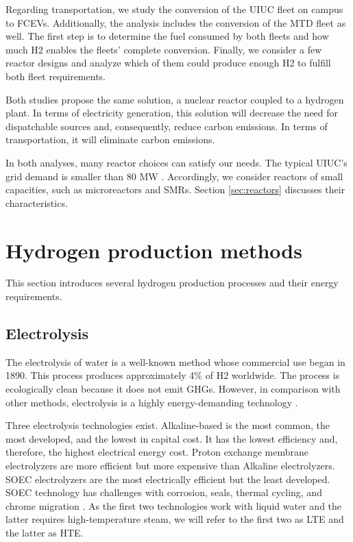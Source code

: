 Regarding transportation, we study the conversion of the \gls{UIUC} fleet on campus to \glspl{FCEV}.
Additionally, the analysis includes the conversion of the \gls{MTD} fleet as well.
The first step is to determine the fuel consumed by both fleets and how much \gls{H2} enables the fleets' complete conversion.
Finally, we consider a few reactor designs and analyze which of them could produce enough \gls{H2} to fulfill both fleet requirements.

Both studies propose the same solution, a nuclear reactor coupled to a hydrogen plant.
In terms of electricity generation, this solution will decrease the need for dispatchable sources and, consequently, reduce carbon emissions.
In terms of transportation, it will eliminate carbon emissions.

In both analyses, many reactor choices can satisfy our needs.
The typical \gls{UIUC}'s grid demand is smaller than 80 MW \cite{dotson_optimal_2020}.
Accordingly, we consider reactors of small capacities, such as microreactors and \glspl{SMR}.
Section \ref{sec:reactors} discusses their characteristics.

\section{Hydrogen production methods}
\label{sec:hydro}

This section introduces several hydrogen production processes and their energy requirements.

\subsection{Electrolysis}

The electrolysis of water is a well-known method whose commercial use began in 1890.
This process produces approximately 4\% of \gls{H2} worldwide.
The process is ecologically clean because it does not emit \glspl{GHG}.
However, in comparison with other methods, electrolysis is a highly energy-demanding technology \cite{kalamaras_hydrogen_2013}.

Three electrolysis technologies exist.
Alkaline-based is the most common, the most developed, and the lowest in capital cost.
It has the lowest efficiency and, therefore, the highest electrical energy cost.
Proton exchange membrane electrolyzers are more efficient but more expensive than Alkaline electrolyzers.
\gls{SOEC} electrolyzers are the most electrically efficient but the least developed.
\gls{SOEC} technology has challenges with corrosion, seals, thermal cycling, and chrome migration \cite{kalamaras_hydrogen_2013}.
As the first two technologies work with liquid water and the latter requires high-temperature steam, we will refer to the first two as \gls{LTE} and the latter as \gls{HTE}.

